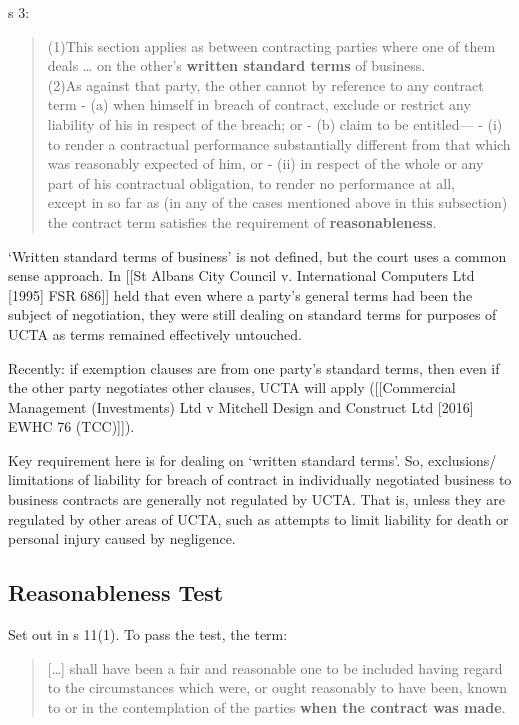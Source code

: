 \documentclass[
]{article}
\begin{document}
s 3:

\begin{quote}
(1)This section applies as between contracting parties where one of them
deals \ldots{} on the other's \textbf{written standard terms} of
business.\\
(2)As against that party, the other cannot by reference to any contract
term - (a) when himself in breach of contract, exclude or restrict any
liability of his in respect of the breach; or - (b) claim to be
entitled--- - (i) to render a contractual performance substantially
different from that which was reasonably expected of him, or - (ii) in
respect of the whole or any part of his contractual obligation, to
render no performance at all,\\
except in so far as (in any of the cases mentioned above in this
subsection) the contract term satisfies the requirement of
\textbf{reasonableness}.
\end{quote}

`Written standard terms of business' is not defined, but the court uses
a common sense approach. In {[}{[}St Albans City Council v.
International Computers Ltd {[}1995{]} FSR 686{]}{]} held that even
where a party's general terms had been the subject of negotiation, they
were still dealing on standard terms for purposes of UCTA as terms
remained effectively untouched.

Recently: if exemption clauses are from one party's standard terms, then
even if the other party negotiates other clauses, UCTA will apply
({[}{[}Commercial Management (Investments) Ltd v Mitchell Design and
Construct Ltd {[}2016{]} EWHC 76 (TCC){]}{]}).

Key requirement here is for dealing on `written standard terms'. So,
exclusions/ limitations of liability for breach of contract in
individually negotiated business to business contracts are generally not
regulated by UCTA. That is, unless they are regulated by other areas of
UCTA, such as attempts to limit liability for death or personal injury
caused by negligence.

\hypertarget{reasonableness-test}{%
\subsection{Reasonableness Test}\label{reasonableness-test}}

Set out in s 11(1). To pass the test, the term:

\begin{quote}
{[}\ldots{]} shall have been a fair and reasonable one to be included
having regard to the circumstances which were, or ought reasonably to
have been, known to or in the contemplation of the parties \textbf{when
the contract was made}.
\end{quote}
\end{document}
